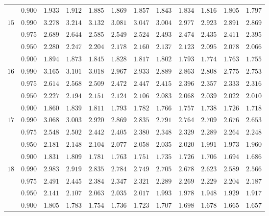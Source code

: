 \documentclass[11pt]{article}
\theoremstyle{definition}
\begin{document}
\begin{table}[H]
\begin{tabularx}{\linewidth}{c | c | c c c c c c c c c c}
		& $0.900$ & $1.933$ & $1.912$ & $1.885$ & $1.869$ & $1.857$ & $1.843$ & $1.834$ & $1.816$ & $1.805$ & $1.797$ \\
		$15$ & $0.990$ & $3.278$ & $3.214$ & $3.132$ & $3.081$ & $3.047$ & $3.004$ & $2.977$ & $2.923$ & $2.891$ & $2.869$ \\
		& $0.975$ & $2.689$ & $2.644$ & $2.585$ & $2.549$ & $2.524$ & $2.493$ & $2.474$ & $2.435$ & $2.411$ & $2.395$ \\
		& $0.950$ & $2.280$ & $2.247$ & $2.204$ & $2.178$ & $2.160$ & $2.137$ & $2.123$ & $2.095$ & $2.078$ & $2.066$ \\
		& $0.900$ & $1.894$ & $1.873$ & $1.845$ & $1.828$ & $1.817$ & $1.802$ & $1.793$ & $1.774$ & $1.763$ & $1.755$ \\
		$16$ & $0.990$ & $3.165$ & $3.101$ & $3.018$ & $2.967$ & $2.933$ & $2.889$ & $2.863$ & $2.808$ & $2.775$ & $2.753$ \\
		& $0.975$ & $2.614$ & $2.568$ & $2.509$ & $2.472$ & $2.447$ & $2.415$ & $2.396$ & $2.357$ & $2.333$ & $2.316$ \\
		& $0.950$ & $2.227$ & $2.194$ & $2.151$ & $2.124$ & $2.106$ & $2.083$ & $2.068$ & $2.039$ & $2.022$ & $2.010$ \\
		& $0.900$ & $1.860$ & $1.839$ & $1.811$ & $1.793$ & $1.782$ & $1.766$ & $1.757$ & $1.738$ & $1.726$ & $1.718$ \\
		$17$ & $0.990$ & $3.068$ & $3.003$ & $2.920$ & $2.869$ & $2.835$ & $2.791$ & $2.764$ & $2.709$ & $2.676$ & $2.653$ \\
		& $0.975$ & $2.548$ & $2.502$ & $2.442$ & $2.405$ & $2.380$ & $2.348$ & $2.329$ & $2.289$ & $2.264$ & $2.248$ \\
		& $0.950$ & $2.181$ & $2.148$ & $2.104$ & $2.077$ & $2.058$ & $2.035$ & $2.020$ & $1.991$ & $1.973$ & $1.960$ \\
		& $0.900$ & $1.831$ & $1.809$ & $1.781$ & $1.763$ & $1.751$ & $1.735$ & $1.726$ & $1.706$ & $1.694$ & $1.686$ \\
		$18$ & $0.990$ & $2.983$ & $2.919$ & $2.835$ & $2.784$ & $2.749$ & $2.705$ & $2.678$ & $2.623$ & $2.589$ & $2.566$ \\
		& $0.975$ & $2.491$ & $2.445$ & $2.384$ & $2.347$ & $2.321$ & $2.289$ & $2.269$ & $2.229$ & $2.204$ & $2.187$ \\
		& $0.950$ & $2.141$ & $2.107$ & $2.063$ & $2.035$ & $2.017$ & $1.993$ & $1.978$ & $1.948$ & $1.929$ & $1.917$ \\
		& $0.900$ & $1.805$ & $1.783$ & $1.754$ & $1.736$ & $1.723$ & $1.707$ & $1.698$ & $1.678$ & $1.665$ & $1.657$ \\

\end{tabularx}
\end{table}
\end{document}
